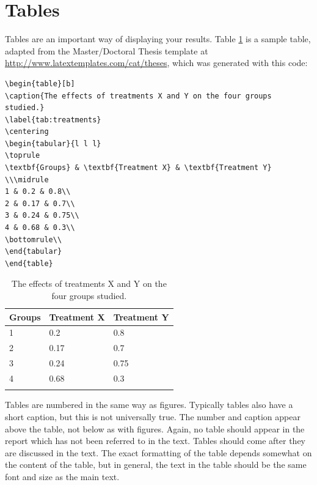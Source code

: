 \section{Tables}
Tables are an important way of displaying your results. Table \ref{tab:treatments} is a sample table, adapted from the Master/Doctoral Thesis template at \url{http://www.latextemplates.com/cat/theses}, which was generated with this code:

{\footnotesize
\begin{verbatim}
\begin{table}[b]
\caption{The effects of treatments X and Y on the four groups studied.}
\label{tab:treatments}
\centering
\begin{tabular}{l l l}
\toprule
\textbf{Groups} & \textbf{Treatment X} & \textbf{Treatment Y} \\\midrule
1 & 0.2 & 0.8\\
2 & 0.17 & 0.7\\
3 & 0.24 & 0.75\\
4 & 0.68 & 0.3\\
\bottomrule\\
\end{tabular}
\end{table}
\end{verbatim}
}

\begin{table}[b]
\caption{The effects of treatments X and Y on the four groups studied.}
\label{tab:treatments}
\centering
\begin{tabular}{l l l}
\toprule
\textbf{Groups} & \textbf{Treatment X} & \textbf{Treatment Y} \\
\midrule
1 & 0.2 & 0.8\\
2 & 0.17 & 0.7\\
3 & 0.24 & 0.75\\
4 & 0.68 & 0.3\\
\bottomrule\\
\end{tabular}
\end{table}

Tables are numbered in the same way as figures. Typically tables also have a short caption, but this is not universally true. The number and caption appear above the table, not below as with figures. Again, no table should appear in the report which has not been referred to in the text. Tables should come after they are discussed in the text. The exact formatting of the table depends somewhat on the content of the table, but in general, the text in the table should be the same font and size as the main text. 

